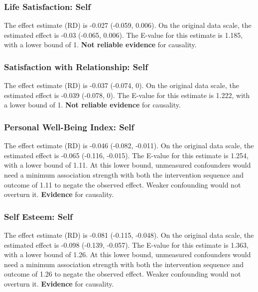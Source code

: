 \documentclass[
  singlecolumn]{article}
\begin{document}
\subsubsection{Life Satisfaction: Self}\label{life-satisfaction-self-2}

The effect estimate (RD) is -0.027 (-0.059, 0.006). On the original data
scale, the estimated effect is -0.03 (-0.065, 0.006). The E-value for
this estimate is 1.185, with a lower bound of 1. \textbf{Not reliable
evidence} for causality.

\subsubsection{Satisfaction with Relationship:
Self}\label{satisfaction-with-relationship-self-2}

The effect estimate (RD) is -0.037 (-0.074, 0). On the original data
scale, the estimated effect is -0.039 (-0.078, 0). The E-value for this
estimate is 1.222, with a lower bound of 1. \textbf{Not reliable
evidence} for causality.

\subsubsection{Personal Well-Being Index:
Self}\label{personal-well-being-index-self-2}

The effect estimate (RD) is -0.046 (-0.082, -0.011). On the original
data scale, the estimated effect is -0.065 (-0.116, -0.015). The E-value
for this estimate is 1.254, with a lower bound of 1.11. At this lower
bound, unmeasured confounders would need a minimum association strength
with both the intervention sequence and outcome of 1.11 to negate the
observed effect. Weaker confounding would not overturn it.
\textbf{Evidence} for causality.

\subsubsection{Self Esteem: Self}\label{self-esteem-self-2}

The effect estimate (RD) is -0.081 (-0.115, -0.048). On the original
data scale, the estimated effect is -0.098 (-0.139, -0.057). The E-value
for this estimate is 1.363, with a lower bound of 1.26. At this lower
bound, unmeasured confounders would need a minimum association strength
with both the intervention sequence and outcome of 1.26 to negate the
observed effect. Weaker confounding would not overturn it.
\textbf{Evidence} for causality.
\end{document}
